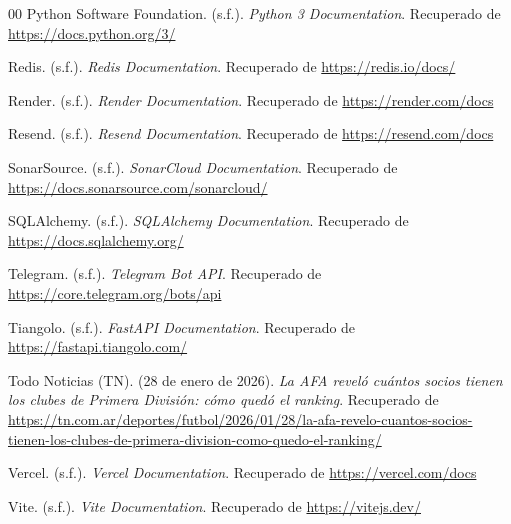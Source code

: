 \documentclass[conference, a4paper]{IEEEtran}
\begin{document}
\begin{thebibliography}{00}
 Python Software Foundation. (s.f.). \textit{Python 3 Documentation}. Recuperado de \url{https://docs.python.org/3/}

 Redis. (s.f.). \textit{Redis Documentation}. Recuperado de \url{https://redis.io/docs/}

 Render. (s.f.). \textit{Render Documentation}. Recuperado de \url{https://render.com/docs}

 Resend. (s.f.). \textit{Resend Documentation}. Recuperado de \url{https://resend.com/docs}

 SonarSource. (s.f.). \textit{SonarCloud Documentation}. Recuperado de \url{https://docs.sonarsource.com/sonarcloud/}

 SQLAlchemy. (s.f.). \textit{SQLAlchemy Documentation}. Recuperado de \url{https://docs.sqlalchemy.org/}

 Telegram. (s.f.). \textit{Telegram Bot API}. Recuperado de \url{https://core.telegram.org/bots/api}

 Tiangolo. (s.f.). \textit{FastAPI Documentation}. Recuperado de \url{https://fastapi.tiangolo.com/}

 Todo Noticias (TN). (28 de enero de 2026). \textit{La AFA revel\'o cu\'antos socios tienen los clubes de Primera Divisi\'on: c\'omo qued\'o el ranking}. Recuperado de \url{https://tn.com.ar/deportes/futbol/2026/01/28/la-afa-revelo-cuantos-socios-tienen-los-clubes-de-primera-division-como-quedo-el-ranking/}

 Vercel. (s.f.). \textit{Vercel Documentation}. Recuperado de \url{https://vercel.com/docs}

 Vite. (s.f.). \textit{Vite Documentation}. Recuperado de \url{https://vitejs.dev/}

\end{thebibliography}
\end{document}
